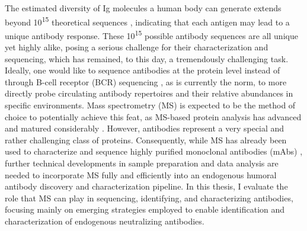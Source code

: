 The estimated diversity of Ig molecules a human body can generate extends beyond 10\textsuperscript{15} theoretical sequences \cite{schroederjr.2006similarity, briney2019commonality}, indicating that each antigen may lead to a unique antibody response. These 10\textsuperscript{15} possible antibody sequences are all unique yet highly alike, posing a serious challenge for their characterization and sequencing, which has remained, to this day, a tremendously challenging task. Ideally, one would like to sequence antibodies at the protein level instead of through B-cell receptor (BCR) sequencing \cite{hom2022exploring}, as is currently the norm, to more directly probe circulating antibody repertoires and their relative abundances in specific environments. Mass spectrometry (MS) is expected to be the method of choice to potentially achieve this feat, as MS-based protein analysis has advanced and matured considerably \cite{altelaar2013next-generation, aebersold2016mass-spectrometric}. However, antibodies represent a very special and rather challenging class of proteins. Consequently, while MS has already been used to characterize and sequence highly purified monoclonal antibodies (mAbs) \cite{sen2017automated, peng2021mass, srzentić2020interlaboratory}, further technical developments in sample preparation and data analysis are needed to incorporate MS fully and efficiently into an endogenous humoral antibody discovery and characterization pipeline. In this thesis, I evaluate the role that MS can play in sequencing, identifying, and characterizing antibodies, focusing mainly on emerging strategies employed to enable identification and characterization of endogenous neutralizing antibodies.

